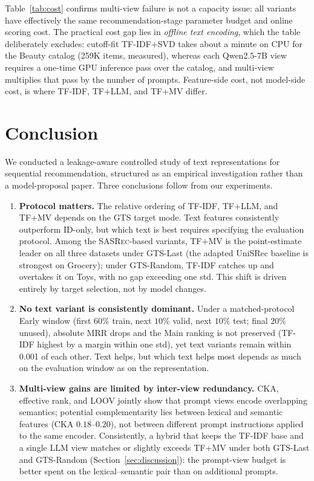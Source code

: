 \documentclass[sigconf,natbib=true,anonymous]{acmart}
\newcommand{\tfidf}{\textsc{TF-IDF}\xspace}
\newcommand{\tfllm}{\textsc{TF+LLM}\xspace}
\newcommand{\tfmv}{\textsc{TF+MV}\xspace}
\newcommand{\base}{\textsc{SASRec}\xspace}
\begin{document}
Table~\ref{tab:cost} confirms multi-view failure is not a capacity issue: all variants have effectively the same recommendation-stage parameter budget and online scoring cost.
The practical cost gap lies in \emph{offline text encoding}, which the table deliberately excludes: cutoff-fit \tfidf+SVD takes about a minute on CPU for the Beauty catalog (259K items, measured), whereas each Qwen2.5-7B view requires a one-time GPU inference pass over the catalog, and multi-view multiplies that pass by the number of prompts.
Feature-side cost, not model-side cost, is where \tfidf, \tfllm, and \tfmv differ.

\section{Conclusion}
\label{sec:conclusion}

We conducted a leakage-aware controlled study of text representations for sequential recommendation, structured as an empirical investigation rather than a model-proposal paper.
Three conclusions follow from our experiments.

\begin{enumerate}[leftmargin=*,itemsep=1pt]
\item \textbf{Protocol matters.}
The relative ordering of \tfidf, \tfllm, and \tfmv depends on the GTS target mode.
Text features consistently outperform ID-only, but which text is best requires specifying the evaluation protocol.
Among the \base-based variants, \tfmv is the point-estimate leader on all three datasets under GTS-Last (the adapted UniSRec baseline is strongest on Grocery); under GTS-Random, \tfidf catches up and overtakes it on Toys, with no gap exceeding one std. This shift is driven entirely by target selection, not by model changes.
\item \textbf{No text variant is consistently dominant.}
Under a matched-protocol Early window (first $60\%$ train, next $10\%$ valid, next $10\%$ test; final $20\%$ unused), absolute MRR drops and the Main ranking is not preserved (\tfidf highest by a margin within one std), yet text variants remain within 0.001 of each other.
Text helps, but which text helps most depends as much on the evaluation window as on the representation.
\item \textbf{Multi-view gains are limited by inter-view redundancy.}
CKA, effective rank, and LOOV jointly show that prompt views encode overlapping semantics; potential complementarity lies between lexical and semantic features (CKA $0.18$--$0.20$), not between different prompt instructions applied to the same encoder.
Consistently, a hybrid that keeps the \tfidf base and a single LLM view matches or slightly exceeds \tfmv under both GTS-Last and GTS-Random (Section~\ref{sec:discussion}): the prompt-view budget is better spent on the lexical--semantic pair than on additional prompts.
\end{enumerate}
\end{document}
